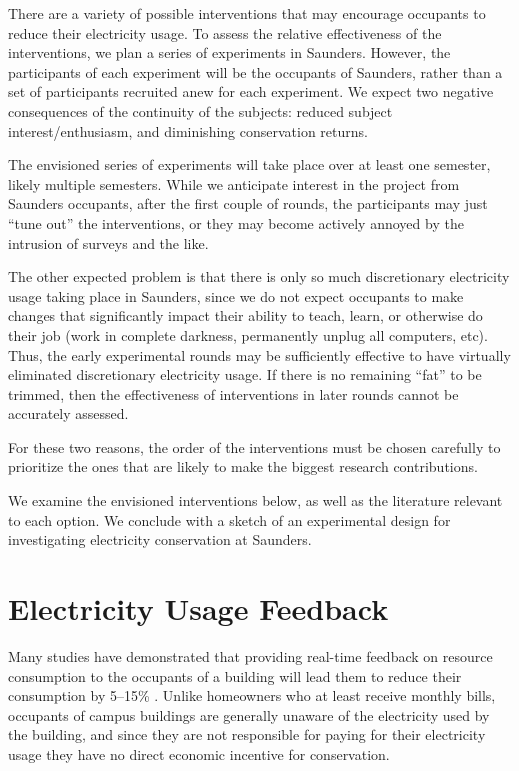 \documentclass[11pt]{article}
\begin{document}
There are a variety of possible interventions that may encourage occupants to reduce their electricity usage. To assess the relative effectiveness of the interventions, we plan a series of experiments in Saunders. However, the participants of each experiment will be the occupants of Saunders, rather than a set of participants recruited anew for each experiment. We expect two negative consequences of the continuity of the subjects: reduced subject interest/enthusiasm, and diminishing conservation returns.

The envisioned series of experiments will take place over at least one semester, likely multiple semesters. While we anticipate interest in the project from Saunders occupants, after the first couple of rounds, the participants may just ``tune out'' the interventions, or they may become actively annoyed by the intrusion of surveys and the like.

The other expected problem is that there is only so much discretionary electricity usage taking place in Saunders, since we do not expect occupants to make changes that significantly impact their ability to teach, learn, or otherwise do their job (work in complete darkness, permanently unplug all computers, etc). Thus, the early experimental rounds may be sufficiently effective to have virtually eliminated discretionary electricity usage. If there is no remaining ``fat'' to be trimmed, then the effectiveness of interventions in later rounds cannot be accurately assessed.

For these two reasons, the order of the interventions must be chosen carefully to prioritize the ones that are likely to make the biggest research contributions.

We examine the envisioned interventions below, as well as the literature relevant to each option. We conclude with a sketch of an experimental design for investigating electricity conservation at Saunders.

\section{Electricity Usage Feedback}
\label{sec:feedback}

Many studies have demonstrated that providing real-time feedback on resource consumption to the occupants of a building will lead them to reduce their consumption by 5--15\% \cite{darby-review-2006}. Unlike homeowners who at least receive monthly bills, occupants of campus buildings are generally unaware of the electricity used by the building, and since they are not responsible for paying for their electricity usage they have no direct economic incentive for conservation.
\end{document}
